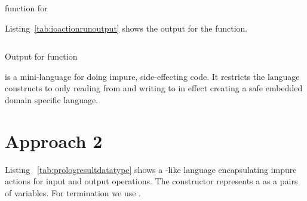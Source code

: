 \documentclass[thesis-solanki.tex]{subfiles}
\begin{document}
\begin{code-list}[H]
\begin{singlespace}
\inputminted{haskell}{haskell-proto4-ioaction-run.hs}
\end{singlespace}
\caption{ function for }
\label{tab:ioactionrun}
\end{code-list}

Listing~\ref{tab:ioactionrunoutput} shows the output for the  function.

\begin{code-list}[H]
\begin{singlespace}
\inputminted{haskell}{haskell-proto4-ioaction-run-output.hs}
\end{singlespace}
\caption{Output for  function}
\label{tab:ioactionrunoutput}
\end{code-list}

 is a mini-language for doing impure, side-effecting code. It restricts the language constructs to only reading 
from  and writing to  in effect creating a safe embedded domain specific language.  

\begin{comment}
\begin{code-list}[H]
\begin{singlespace}
  \inputminted[linenos]{haskell}{haskell-proto4-purvey-wincer.hs}
\end{singlespace}
\caption{\protect\haskellConstruct{IOAction} definitions}
\label{lis:IOAction}
\end{code-list}
\end{comment}


\section{Approach 2}

\begin{comment}
So when the program is getting interpreted the interpreter encounters an IO operation which then gets "interpreted" to the above and it 
continues normally.

The interpreted program is still pure since the IO actions have not been executed 

if the running is done inside a monad then the IO still is pure.
\end{comment}


Listing ~\ref{tab:prologresultdatatype} shows a -like language encapsulating impure actions for input and output 
operations. The  constructor represents a  as a pairs of variables. For termination 
we use . 
\end{document}
